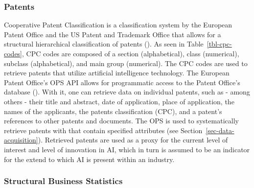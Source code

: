 \documentclass[
  12pt,
  a4paperpaper,
]{article}
\begin{document}
\subsubsection{Patents}\label{patents}

Cooperative Patent Classification is a classification system by the
European Patent Office and the US Patent and Trademark Office that
allows for a structural hierarchical classification of patents
(). As seen in Table~\ref{tbl-cpc-codes}, CPC codes
are composed of a section (alphabetical), class (numerical), subclass
(alphabetical), and main group (numerical). The CPC codes are used to
retrieve patents that utilize artificial intelligence technology. The
European Patent Office's OPS API allows for programmatic access to the
Patent Office's database
(). With it, one can retrieve data on individual patents, such as -
among others - their title and abstract, date of application, place of
application, the names of the applicants, the patents classification
(CPC), and a patent's references to other patents and documents. The OPS
is used to systematically retrieve patents with that contain specified
attributes (see Section~\ref{sec-data-acquisition}). Retrieved patents
are used as a proxy for the current level of interest and level of
innovation in AI, which in turn is assumed to be an indicator for the
extend to which AI is present within an industry.

\subsubsection{Structural Business
Statistics}\label{structural-business-statistics}
\end{document}
